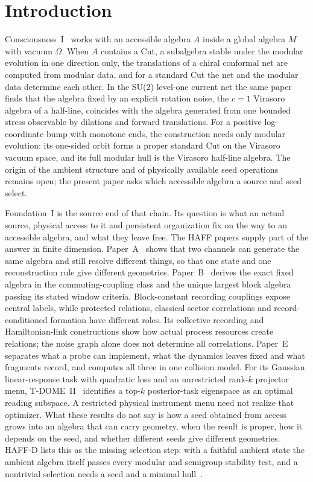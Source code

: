 \documentclass[12pt]{article}
\theoremstyle{definition}
\theoremstyle{remark}
\begin{document}
\clearpage
\tableofcontents
\clearpage

\section{Introduction}\label{sec:intro}

Consciousness~I~\cite{PaperI} works with an accessible algebra \(A\) inside a global
algebra \(M\) with vacuum \(\Omega\). When \(A\) contains a Cut, a subalgebra stable
under the modular evolution in one direction only, the translations of a chiral
conformal net are computed from modular data, and for a standard Cut the net and the
modular data determine each other. In the SU(2) level-one current net the same paper
finds that the algebra fixed by an explicit rotation noise, the \(c=1\) Virasoro
algebra of a half-line, coincides with the algebra generated from one bounded stress
observable by dilations and forward translations. For a positive log-coordinate
bump with monotone ends, the construction needs only modular evolution:
its one-sided orbit forms a proper standard Cut on the Virasoro vacuum space,
and its full modular hull is the Virasoro half-line algebra. The origin of the
ambient structure and of physically available seed operations remains open;
the present paper asks which accessible algebra a source and seed select.

Foundation~I is the source end of that chain. Its question is what an actual source,
physical access to it and persistent organization fix on the way to an accessible
algebra, and what they leave free. The HAFF papers supply part of the answer in finite
dimension. Paper~A~\cite{HAFFA} shows that two channels can generate the same algebra
and still resolve different things, so that one state and one reconstruction rule give
different geometries. Paper~B~\cite{HAFFB} derives the exact fixed algebra in the commuting-coupling
class and the unique largest block algebra passing its stated window criteria.
Block-constant recording couplings expose central labels, while protected
relations, classical sector correlations and record-conditioned formation have
different roles. Its collective recording and Hamiltonian-link constructions
show how actual process resources create relations; the noise graph alone does
not determine all correlations. Paper~E~\cite{HAFFE}
separates what a probe can implement, what the dynamics leaves fixed and what fragments
record, and computes all three in one collision model. For its Gaussian
linear-response task with quadratic loss and an unrestricted rank-\(k\)
projector menu, T-DOME~II~\cite{TDOMEII} identifies a top-\(k\)
posterior-task eigenspace as an optimal reading subspace. A restricted
physical instrument menu need not realize that optimizer. What these results do not say is how a seed obtained from access
grows into an algebra that can carry geometry, when the result is proper, how it
depends on the seed, and whether different seeds give different geometries. HAFF-D
lists this as the missing selection step: with a faithful ambient state the ambient
algebra itself passes every modular and semigroup stability test, and a nontrivial
selection needs a seed and a minimal hull~\cite{HAFFD}.
\end{document}
